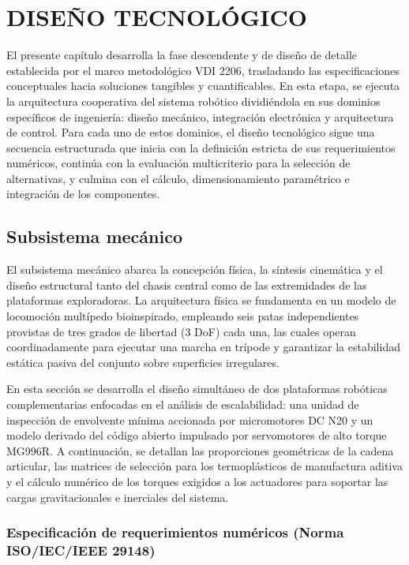 \chapter{DISEÑO TECNOLÓGICO}

El presente capítulo desarrolla la fase descendente y de diseño de detalle establecida por el marco metodológico VDI 2206, trasladando las especificaciones conceptuales hacia soluciones tangibles y cuantificables. En esta etapa, se ejecuta la arquitectura cooperativa del sistema robótico dividiéndola en sus dominios específicos de ingeniería: diseño mecánico, integración electrónica y arquitectura de control. Para cada uno de estos dominios, el diseño tecnológico sigue una secuencia estructurada que inicia con la definición estricta de sus requerimientos numéricos, continúa con la evaluación multicriterio para la selección de alternativas, y culmina con el cálculo, dimensionamiento paramétrico e integración de los componentes.

\section{Subsistema mecánico}

El subsistema mecánico abarca la concepción física, la síntesis cinemática y el diseño estructural tanto del chasis central como de las extremidades de las plataformas exploradoras. La arquitectura física se fundamenta en un modelo de locomoción multípedo bioinspirado, empleando seis patas independientes provistas de tres grados de libertad (3 DoF) cada una, las cuales operan coordinadamente para ejecutar una marcha en trípode y garantizar la estabilidad estática pasiva del conjunto sobre superficies irregulares. 

En esta sección se desarrolla el diseño simultáneo de dos plataformas robóticas complementarias enfocadas en el análisis de escalabilidad: una unidad de inspección de envolvente mínima accionada por micromotores DC N20 y un modelo derivado del código abierto impulsado por servomotores de alto torque MG996R. A continuación, se detallan las proporciones geométricas de la cadena articular, las matrices de selección para los termoplásticos de manufactura aditiva y el cálculo numérico de los torques exigidos a los actuadores para soportar las cargas gravitacionales e inerciales del sistema.

\subsection{Especificación de requerimientos numéricos (Norma ISO/IEC/IEEE 29148)}


